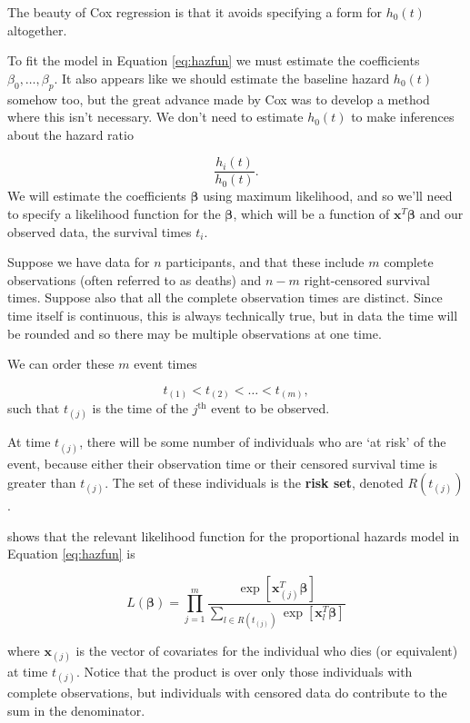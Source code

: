 \documentclass[
  openany]{book}
\theoremstyle{definition}
\theoremstyle{definition}
\theoremstyle{definition}
\theoremstyle{definition}
\theoremstyle{remark}
\begin{document}
The beauty of Cox regression is that it avoids specifying a form for \(h_0\left(t\right)\) altogether.

To fit the model in Equation \eqref{eq:hazfun} we must estimate the coefficients \(\beta_0,\ldots,\beta_p\). It also appears like we should estimate the baseline hazard \(h_0\left(t\right)\) somehow too, but the great advance made by Cox was to develop a method where this isn't necessary. We don't need to estimate \(h_0\left(t\right)\) to make inferences about the hazard ratio

\[\frac{h_i\left(t\right)}{h_0\left(t\right)}.\]
We will estimate the coefficients \(\boldsymbol\beta\) using maximum likelihood, and so we'll need to specify a likelihood function for the \(\boldsymbol\beta\), which will be a function of \(\mathbf{x}^T\boldsymbol\beta\) and our observed data, the survival times \(t_i\).

Suppose we have data for \(n\) participants, and that these include \(m\) complete observations (often referred to as deaths) and \(n-m\) right-censored survival times. Suppose also that all the complete observation times are distinct. Since time itself is continuous, this is always technically true, but in data the time will be rounded and so there may be multiple observations at one time.

We can order these \(m\) event times

\[t_{(1)}< t_{(2)} < \ldots < t_{(m)},\]
such that \(t_{(j)}\) is the time of the \(j^{\text{th}}\) event to be observed.

At time \(t_{(j)}\), there will be some number of individuals who are `at risk' of the event, because either their observation time or their censored survival time is greater than \(t_{(j)}\). The set of these individuals is the \textbf{risk set}, denoted \(R\left(t_{(j)}\right)\).

\citet{cox1972regression} shows that the relevant likelihood function for the proportional hazards model in Equation \eqref{eq:hazfun} is

\begin{equation}
L\left(\boldsymbol\beta\right) = \prod\limits_{j=1}^m\frac{\exp\left[\mathbf{x}_{(j)}^T\boldsymbol\beta\right]}{\sum\limits_{l\in R\left(t_{(j)}\right)}{\exp\left[\mathbf{x}_l^T\boldsymbol\beta\right]}}
\label{eq:lcox}
\end{equation}

where \(\mathbf{x}_{(j)}\) is the vector of covariates for the individual who dies (or equivalent) at time \(t_{(j)}\). Notice that the product is over only those individuals with complete observations, but individuals with censored data do contribute to the sum in the denominator.
\end{document}
